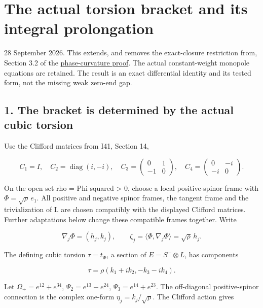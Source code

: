 \documentclass[
  10pt,
]{article}
\author{}
\date{}
\begin{document}
\hypertarget{the-actual-torsion-bracket-and-its-integral-prolongation}{%
\section{The actual torsion bracket and its integral
prolongation}\label{the-actual-torsion-bracket-and-its-integral-prolongation}}

28 September 2026. This extends, and removes the exact-closure
restriction from, Section 3.2 of the
\href{20260928_zero_endpoint_phase_curvature.md}{phase-curvature proof}.
The actual constant-weight monopole equations are retained. The result
is an exact differential identity and its tested form, not the missing
weak zero-end gap.

\hypertarget{the-bracket-is-determined-by-the-actual-cubic-torsion}{%
\subsection{1. The bracket is determined by the actual cubic
torsion}\label{the-bracket-is-determined-by-the-actual-cubic-torsion}}

Use the Clifford matrices from I41, Section 14,

\[
 C_1=I,\quad C_2=\operatorname{diag}(i,-i),\quad
 C_3=\begin{pmatrix}0&1\\-1&0\end{pmatrix},\quad
 C_4=\begin{pmatrix}0&-i\\-i&0\end{pmatrix}.
\]

On the open set rho = \textbar Phi\textbar{} squared \textgreater{} 0,
choose a local positive-spinor frame with \(\Phi=\sqrt\rho\,e_1\). All
positive and negative spinor frames, the tangent frame and the
trivialization of L are chosen compatibly with the displayed Clifford
matrices. Further adaptations below change these compatible frames
together. Write

\[
 \nabla_j\Phi=(h_j,k_j),\qquad
 \zeta_j=\langle\Phi,\nabla_j\Phi\rangle=\sqrt\rho\,h_j.
\]

The defining cubic torsion \(\tau=t_\Phi\), a section of
\(E=S^-\otimes L\), has components

\[
             \tau=\rho(k_1+ik_2,-k_3-ik_4).                \tag{1.1}
\]

Let \(\Omega_+=e^{12}+e^{34}\), \(\Psi_2=e^{13}-e^{24}\),
\(\Psi_3=e^{14}+e^{23}\). The off-diagonal positive-spinor connection is
the complex one-form \(\eta_j=k_j/\sqrt\rho\). The Clifford action gives
\end{document}
